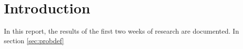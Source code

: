 \section{Introduction}
In this report, the results of the first two weeks of research are documented. In section \ref{sec:probdef}